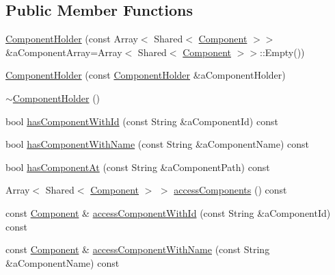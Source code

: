 \subsection*{Public Member Functions}
\begin{DoxyCompactItemize}
\item 
\hyperlink{classostk_1_1simulation_1_1utilities_1_1_component_holder_a8c55b3d1233adaa5363893de07b44c40}{Component\+Holder} (const Array$<$ Shared$<$ \hyperlink{classostk_1_1simulation_1_1_component}{Component} $>$$>$ \&a\+Component\+Array=Array$<$ Shared$<$ \hyperlink{classostk_1_1simulation_1_1_component}{Component} $>$$>$\+::Empty())
\item 
\hyperlink{classostk_1_1simulation_1_1utilities_1_1_component_holder_a62afb2161daf9f4dba0a02c2cd1d644d}{Component\+Holder} (const \hyperlink{classostk_1_1simulation_1_1utilities_1_1_component_holder}{Component\+Holder} \&a\+Component\+Holder)
\item 
\hyperlink{classostk_1_1simulation_1_1utilities_1_1_component_holder_ad0adf394f0c30d64e5ccbf7638802b02}{$\sim$\+Component\+Holder} ()
\item 
bool \hyperlink{classostk_1_1simulation_1_1utilities_1_1_component_holder_a401459c4bd2606f6e15c4af732240e6b}{has\+Component\+With\+Id} (const String \&a\+Component\+Id) const
\item 
bool \hyperlink{classostk_1_1simulation_1_1utilities_1_1_component_holder_a74f0c97edae7bd4e8cf626749374aa3b}{has\+Component\+With\+Name} (const String \&a\+Component\+Name) const
\item 
bool \hyperlink{classostk_1_1simulation_1_1utilities_1_1_component_holder_ac8f363b3946caf1afbc6278931a9d764}{has\+Component\+At} (const String \&a\+Component\+Path) const
\item 
Array$<$ Shared$<$ \hyperlink{classostk_1_1simulation_1_1_component}{Component} $>$ $>$ \hyperlink{classostk_1_1simulation_1_1utilities_1_1_component_holder_a71d4e98af453e82bf1257d926b29fe78}{access\+Components} () const
\item 
const \hyperlink{classostk_1_1simulation_1_1_component}{Component} \& \hyperlink{classostk_1_1simulation_1_1utilities_1_1_component_holder_ad3f8b1059d3e41ce87c6916f0e2efb71}{access\+Component\+With\+Id} (const String \&a\+Component\+Id) const
\item 
const \hyperlink{classostk_1_1simulation_1_1_component}{Component} \& \hyperlink{classostk_1_1simulation_1_1utilities_1_1_component_holder_a5ebd352bbc6031ff288106be9e4cc4c8}{access\+Component\+With\+Name} (const String \&a\+Component\+Name) const

\end{DoxyCompactItemize}
